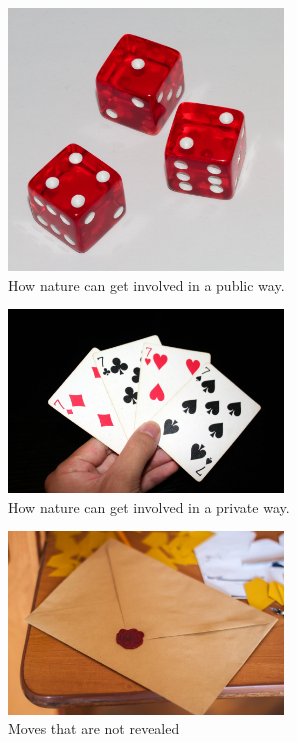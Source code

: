 \documentclass[
  ignorenonframetext,
]{beamer}
\begin{document}
\begin{frame}
\begin{figure}
\centering
\includegraphics[width=0.65\textwidth,height=0.65\textheight]{images/dice.jpg}
\caption{How nature can get involved in a public way.}
\end{figure}
\end{frame}

\begin{frame}
\begin{figure}
\centering
\includegraphics[width=0.65\textwidth,height=0.65\textheight]{images/cards.jpg}
\caption{How nature can get involved in a private way.}
\end{figure}
\end{frame}

\begin{frame}
\begin{figure}
\centering
\includegraphics[width=0.65\textwidth,height=0.65\textheight]{images/sealed_envelope.jpg}
\caption{Moves that are not revealed}
\end{figure}
\end{frame}
\end{document}
